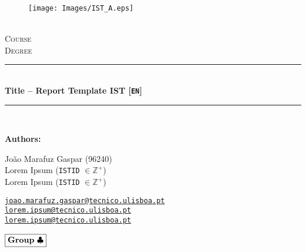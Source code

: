 \documentclass[12pt]{article}
\newcommand{\HRule}{\rule{\linewidth}{0.5mm}} %
\begin{document}
\begin{center}
    \begin{figure}
        \vspace{-1.0cm}
        \texttt{[image: Images/IST\_A.eps]} %
    \end{figure}
    \mbox{}\\[2.0cm]
    \textsc{\Huge Course}\\[2.5cm]
    \textsc{\LARGE Degree}\\[2.0cm]
    \HRule\\[0.4cm]
    {\large \bf Title -- Report Template IST [\texttt{EN}]}\\[0.2cm]
    \HRule\\[1.5cm]
\end{center}

\begin{flushleft}
    \textbf{Authors:}
\end{flushleft}

\begin{center}
    \begin{minipage}{0.5\textwidth}
        \begin{flushleft}
            João Marafuz Gaspar (96240)\\
            Lorem Ipsum (\texttt{ISTID} $\in \mathbb{Z}^+$)\\
            Lorem Ipsum (\texttt{ISTID} $\in \mathbb{Z}^+$)
        \end{flushleft}
    \end{minipage}%
    \begin{minipage}{0.5\textwidth}
        \begin{flushright}
            \href{mailto:joao.marafuz.gaspar@tecnico.ulisboa.pt}{\texttt{joao.marafuz.gaspar@tecnico.ulisboa.pt}}\\
            \href{mailto:lorem.ipsum@tecnico.ulisboa.pt}{\texttt{lorem.ipsum@tecnico.ulisboa.pt}}\\
            \href{mailto:lorem.ipsum@tecnico.ulisboa.pt}{\texttt{lorem.ipsum@tecnico.ulisboa.pt}}
        \end{flushright}
    \end{minipage}
\end{center}
    
\begin{flushleft}
    \large $\boxed{\text{\bf Group} \ \clubsuit}$\\[4.0cm]
\end{flushleft}
    
\end{document}
